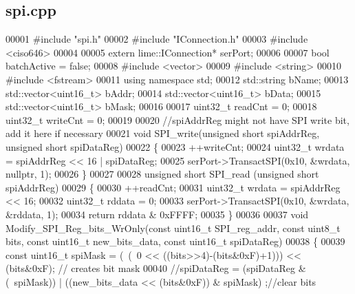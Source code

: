\subsection{spi.\+cpp}
\label{spi_8cpp_source}

\begin{DoxyCode}
00001 \textcolor{preprocessor}{#include "spi.h"}
00002 \textcolor{preprocessor}{#include "IConnection.h"}
00003 \textcolor{preprocessor}{#include <ciso646>}
00004 
00005 \textcolor{keyword}{extern} lime::IConnection* serPort;
00006 
00007 \textcolor{keywordtype}{bool} batchActive = \textcolor{keyword}{false};
00008 \textcolor{preprocessor}{#include <vector>}
00009 \textcolor{preprocessor}{#include <string>}
00010 \textcolor{preprocessor}{#include <fstream>}
00011 \textcolor{keyword}{using namespace }std;
00012 std::string bName;
00013 std::vector<uint16\_t> bAddr;
00014 std::vector<uint16\_t> bData;
00015 std::vector<uint16\_t> bMask;
00016 
00017 uint32\_t readCnt = 0;
00018 uint32\_t writeCnt = 0;
00019 
00020 \textcolor{comment}{//spiAddrReg might not have SPI write bit, add it here if necessary}
00021 \textcolor{keywordtype}{void} SPI_write(\textcolor{keywordtype}{unsigned} \textcolor{keywordtype}{short} spiAddrReg, \textcolor{keywordtype}{unsigned} \textcolor{keywordtype}{short} spiDataReg)
00022 \{
00023     ++writeCnt;
00024     uint32\_t wrdata = spiAddrReg << 16 | spiDataReg;
00025     serPort->TransactSPI(0x10, &wrdata, \textcolor{keyword}{nullptr}, 1);
00026 \}
00027 
00028 \textcolor{keywordtype}{unsigned} \textcolor{keywordtype}{short} SPI_read (\textcolor{keywordtype}{unsigned} \textcolor{keywordtype}{short} spiAddrReg)
00029 \{
00030     ++readCnt;
00031     uint32\_t wrdata = spiAddrReg << 16;
00032     uint32\_t rddata = 0;
00033     serPort->TransactSPI(0x10, &wrdata, &rddata, 1);
00034     \textcolor{keywordflow}{return} rddata & 0xFFFF;
00035 \}
00036 
00037 \textcolor{keywordtype}{void} Modify_SPI_Reg_bits_WrOnly(\textcolor{keyword}{const} uint16\_t SPI\_reg\_addr, \textcolor{keyword}{const} uint8\_t bits, \textcolor{keyword}{const} uint16\_t 
      new\_bits\_data, \textcolor{keyword}{const} uint16\_t spiDataReg)
00038 \{
00039     \textcolor{keyword}{const} uint16\_t spiMask = (~(~0 << ((bits>>4)-(bits&0xF)+1))) << (bits&0xF); \textcolor{comment}{// creates bit mask}
00040     \textcolor{comment}{//spiDataReg = (spiDataReg & (~spiMask)) | ((new\_bits\_data << (bits&0xF)) & spiMask) ;//clear bits}

\end{DoxyCode}
